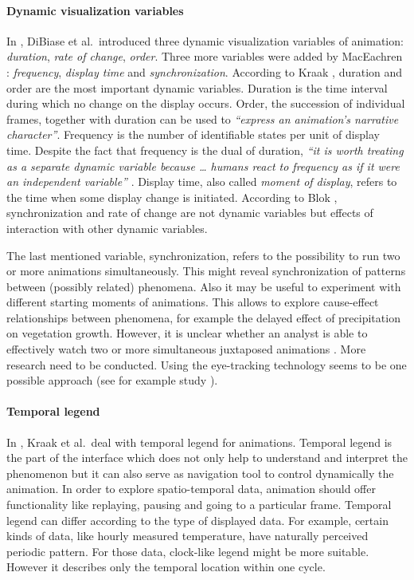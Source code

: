 \documentclass[a4paper,12pt,oneside]{book}
\begin{document}
\paragraph{Dynamic visualization variables}
In \cite{dibiase1992animation}, DiBiase et al.\ introduced three dynamic visualization variables of animation:
\emph{duration}, \emph{rate of change}, \emph{order}.
Three more variables were added by MacEachren \cite{maceachren2004maps}:
\emph{frequency}, \emph{display time} and \emph{synchronization}.
According to Kraak \cite{kraak2000visualisation}, duration and order are the most important
dynamic variables. Duration is the time interval during which no change on the display occurs.
Order, the succession of individual frames, together with duration can be used to
\emph{``express an animation's narrative character''}\cite[p.~31]{kraak2000visualisation}.
Frequency is the number of identifiable states per unit of display time.
Despite the fact that frequency is the dual of duration,
\emph{``it is worth treating as a separate dynamic variable because \ldots
humans react to frequency as if it were an independent variable''} \cite{kraak1994visualization}.
Display time, also called \emph{moment of display}, refers to the time when some display change is initiated.
According to Blok  \cite{blok2005dynamic}, synchronization and rate of change are not dynamic variables
but effects of interaction with other dynamic variables.

The last mentioned variable, synchronization, refers to the possibility to run two or more
animations simultaneously. This might reveal synchronization of patterns between (possibly related) phenomena.
Also it may be useful to experiment with different starting moments of animations.
This allows to explore cause-effect relationships between phenomena, for example
the delayed effect of precipitation on vegetation growth.
However, it is unclear whether an analyst is able to effectively watch two or more simultaneous
juxtaposed animations \cite{andrienko2003exploratory}. More research need to be conducted.
Using the eye-tracking technology seems to be one possible approach
(see for example study \cite{opach2011evaluating}).

\paragraph{Temporal legend}
In \cite{kraak1997cartographic}, Kraak et al.\ deal with temporal legend for animations.
Temporal legend is the part of the interface which does not only help to understand and interpret
the phenomenon but it can also serve as navigation tool to control dynamically the animation.
In order to explore spatio-temporal data, animation should offer functionality like replaying, pausing
and going to a particular frame.
Temporal legend can differ according to the type of displayed data.
For example, certain kinds of data, like hourly measured temperature, have naturally perceived periodic pattern.
For those data, clock-like legend might be more suitable.
However it describes only the temporal location within one cycle.
\end{document}
